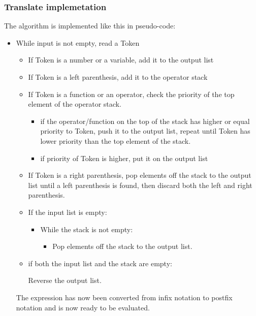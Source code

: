 \documentclass[12pt,a4paper]{article}
\begin{document}
\subsubsection{Translate implemetation}
\textnormal{
The algorithm is implemented like this in pseudo-code:
}

\begin{itemize}
  \item While input is not empty, read a Token
\begin{itemize}
    \item If Token is a number or a variable, add it to the output list
    \item If Token is a left parenthesis, add it to the operator stack
    \item If Token is a function or an operator, check the priority of the top element of the operator stack.
    \begin{itemize}
      \item if the operator/function on the top of the stack has higher or equal priority to Token, 
      push it to the output list, repeat until Token has lower priority than the top element of the stack.
      \item if priority of Token is higher, put it on the output list
    \end{itemize}
    \item If Token is a right parenthesis, pop elements off the stack to the output list until a left 
    parenthesis is found, then discard both the left and right parenthesis.
    \item If the input list is empty:
    \begin{itemize}
      \item While the stack is not empty:
      \begin{itemize}
        \item Pop elements off the stack to the output list.
      \end{itemize}
    \end{itemize}
    \item if both the input list and the stack are empty:
    \begin{itemize}
      Reverse the output list.
    \end{itemize}
\end{itemize}
\textnormal{
  The expression has now been converted from infix notation to postfix notation and is now ready to be evaluated.
  \newline
  \newline
}
\end{itemize}
\end{document}

